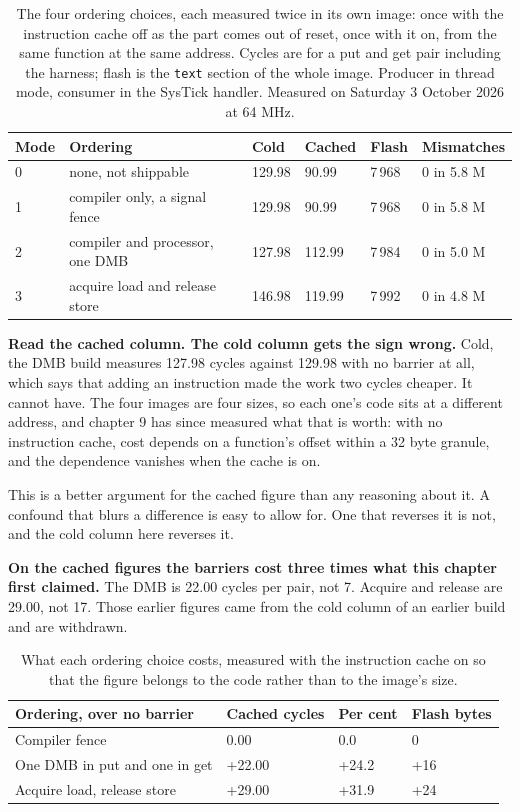 \begin{table}[H]\centering\small
\begin{tabular}{p{8mm}p{38mm}p{18mm}p{18mm}p{16mm}p{18mm}}
\toprule
Mode & Ordering & Cold & Cached & Flash & Mismatches \\
\midrule
0 & none, not shippable & 129.98 & 90.99 & 7\,968 & 0 in 5.8 M \\
1 & compiler only, a signal fence & 129.98 & 90.99 & 7\,968 & 0 in 5.8 M \\
2 & compiler and processor, one DMB & 127.98 & 112.99 & 7\,984 & 0 in 5.0 M \\
3 & acquire load and release store & 146.98 & 119.99 & 7\,992 & 0 in 4.8 M \\
\bottomrule
\end{tabular}
\caption{The four ordering choices, each measured twice in its own image: once with the instruction cache off as the part comes out of reset, once with it on, from the same function at the same address. Cycles are for a put and get pair including the harness; flash is the \texttt{text} section of the whole image. Producer in thread mode, consumer in the SysTick handler. Measured on Saturday 3 October 2026 at 64 MHz.}
\end{table}

\textbf{Read the cached column. The cold column gets the sign wrong.} Cold, the
DMB build measures 127.98 cycles against 129.98 with no barrier at all, which says
that adding an instruction made the work two cycles cheaper. It cannot have. The
four images are four sizes, so each one's code sits at a different address, and
chapter 9 has since measured what that is worth: with no instruction cache, cost
depends on a function's offset within a 32 byte granule, and the dependence
vanishes when the cache is on.

This is a better argument for the cached figure than any reasoning about it. A
confound that blurs a difference is easy to allow for. One that reverses it is not,
and the cold column here reverses it.

\textbf{On the cached figures the barriers cost three times what this chapter
first claimed.} The DMB is 22.00 cycles per pair, not 7. Acquire and release are
29.00, not 17. Those earlier figures came from the cold column of an earlier build
and are withdrawn.

\begin{table}[H]\centering\small
\begin{tabular}{p{44mm}p{24mm}p{24mm}p{26mm}}
\toprule
Ordering, over no barrier & Cached cycles & Per cent & Flash bytes \\
\midrule
Compiler fence & 0.00 & 0.0 & 0 \\
One DMB in put and one in get & +22.00 & +24.2 & +16 \\
Acquire load, release store & +29.00 & +31.9 & +24 \\
\bottomrule
\end{tabular}
\caption{What each ordering choice costs, measured with the instruction cache on so that the figure belongs to the code rather than to the image's size.}
\end{table}

